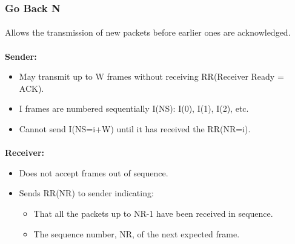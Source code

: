 \documentclass[../resumosRCOM.tex]{subfiles}
\begin{document}
\subsubsection{Go Back N}
\paragraph{}
Allows the transmission of new packets before earlier ones are acknowledged.

\paragraph{}
\textbf{Sender:}
\begin{itemize}
    \item May transmit up to W frames without receiving RR(Receiver Ready = ACK).
    \item I frames are numbered sequentially I(NS): I(0), I(1), I(2), etc.
    \item Cannot send I(NS=i+W) until it has received the RR(NR=i).   
\end{itemize}

\paragraph{}
\textbf{Receiver:}
\begin{itemize}
    \item Does not accept frames out of sequence.
    \item Sends RR(NR) to sender indicating:
    \begin{itemize}
        \item That all the packets up to NR-1 have been received in sequence.
        \item The sequence number, NR, of the next expected frame.
    \end{itemize}
\end{itemize}
\end{document}

